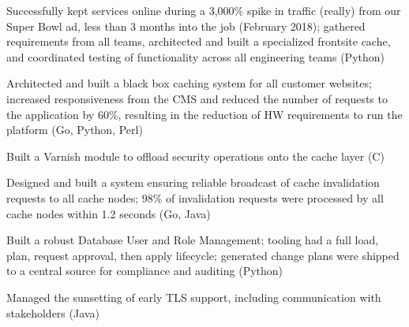 \item Successfully kept services online during a 3,000\% spike in traffic (really) from our Super Bowl ad, less than 3
  months into the job (February 2018); gathered requirements from all teams, architected and built a specialized
  frontsite cache, and coordinated testing of functionality across all engineering teams (Python)

\item Architected and built a black box caching system for all customer websites; increased responsiveness from the CMS
  and reduced the number of requests to the application by 60\%, resulting in the reduction of HW requirements to run
  the platform (Go, Python, Perl)

\item Built a Varnish module to offload security operations onto the cache layer (C)

\item Designed and built a system ensuring reliable broadcast of cache invalidation requests to all cache nodes; 98\% of
  invalidation requests were processed by all cache nodes within 1.2 seconds (Go, Java)

\item Built a robust Database User and Role Management; tooling had a full load, plan, request approval, then apply
  lifecycle; generated change plans were shipped to a central source for compliance and auditing (Python)

\item Managed the sunsetting of early TLS support, including communication with stakeholders (Java)
